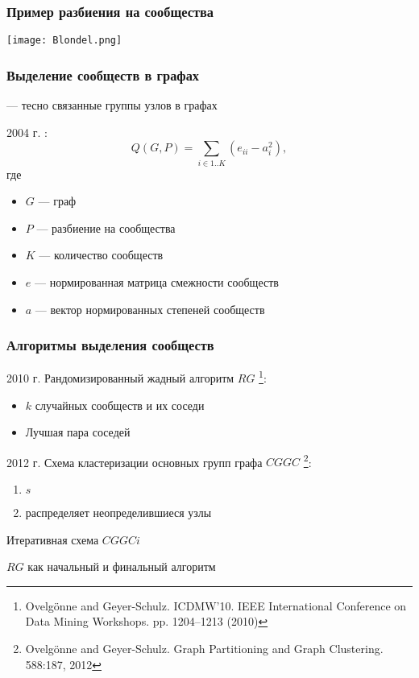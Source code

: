 \begin{frame}
	\frametitle{Пример разбиения на сообщества}
	\begin{center}
		\texttt{[image: Blondel.png]}
	\end{center}
\end{frame}

\begin{frame}
	\frametitle{Выделение сообществ в графах}
	 --- тесно связанные группы узлов в графах

	2004 г. :
	$$Q(G, P) = \sum_{i \in 1..K}{\left(e_{ii} - a_i^2\right)},$$
	где
	\begin{itemize} 
		\item $G$ --- граф
		\item $P$ --- разбиение на сообщества
		\item $K$ --- количество сообществ
		\item $e$ --- нормированная матрица смежности сообществ
		\item $a$ --- вектор нормированных степеней сообществ
	\end{itemize}
\end{frame}


\begin{frame}
	\frametitle{Алгоритмы выделения сообществ}


	2010 г. Рандомизированный жадный алгоритм $RG$%
	\footnote{\scriptsize Ovelg{\"o}nne and Geyer-Schulz.  ICDMW'10. IEEE International Conference on Data Mining Workshops. pp. 1204–1213 (2010)}:
	\begin{itemize}
		\item $k$ случайных сообществ и их соседи
		\item Лучшая пара соседей
	\end{itemize}\vspace{.5em}

	2012 г. Схема кластеризации основных групп графа $CGGC$%
	\footnote{\scriptsize Ovelg{\"o}nne and Geyer-Schulz.  Graph Partitioning and Graph Clustering. 588:187, 2012}:
	\begin{enumerate}
		\item $s$ 
		\item {} распределяет неопределившиеся узлы
	\end{enumerate}\vspace{.5em}

	Итеративная схема $CGGCi$ \vspace{.5em}

	$RG$ как начальный и финальный алгоритм
\end{frame}


